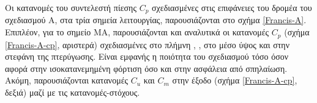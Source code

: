 Οι κατανομές του συντελεστή πίεσης $C_p$ σχεδιασμένες στις επιφάνειες του δρομέα του σχεδιασμού Α, στα τρία σημεία λειτουργίας, παρουσιάζονται στο σχήμα \ref{Francis-A}. Επιπλέον, για το σημείο ΜΑ, παρουσιάζονται και αναλυτικά οι κατανομές $C_p$ (σχήμα \ref{Francis-A-cp}, αριστερά) σχεδιασμένες στο πλήμνη , , στο μέσο ύψος  και στην στεφάνη  της πτερύγωσης. Είναι εμφανής η ποιότητα του σχεδιασμού τόσο όσον αφορά στην ισοκατανεμημένη φόρτιση όσο και στην ασφάλεια από σπηλαίωση. Ακόμη, παρουσιάζονται κατανομές $C_u$ και $C_m$ στην έξοδο (σχήμα \ref{Francis-A-cp}, δεξιά) μαζί με τις κατανομές-στόχους.

\begin{figure}[h!]
\begin{minipage}[b]{0.5\linewidth}
 \centering
\end{minipage}
\begin{minipage}[b]{0.5\linewidth}
 \centering

\end{minipage}
\end{figure}
